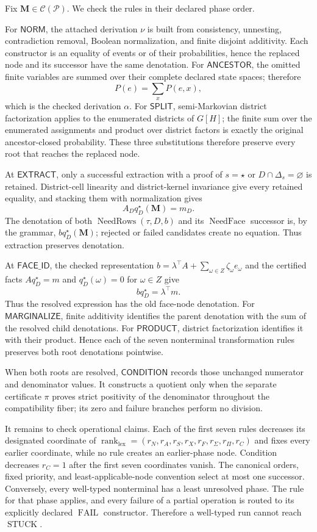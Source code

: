 Fix \(\mathbf M\in\mathcal C(\mathcal P)\).  We check the rules in their declared phase order.

For \(\mathsf{NORM}\), the attached derivation \(\nu\) is built from consistency, unnesting, contradiction removal, Boolean normalization, and finite disjoint additivity.  Each constructor is an equality of events or of their probabilities, hence the replaced node and its successor have the same denotation.  For \(\mathsf{ANCESTOR}\), the omitted finite variables are summed over their complete declared state spaces; therefore
\[
 P(e)=\sum_xP(e,x),
\]
which is the checked derivation \(\alpha\).  For \(\mathsf{SPLIT}\), semi-Markovian district factorization applies to the enumerated districts of \(G[H]\); the finite sum over the enumerated assignments and product over district factors is exactly the original ancestor-closed probability.  These three substitutions therefore preserve every root that reaches the replaced node.

At \(\mathsf{EXTRACT}\), only a successful extraction with a proof of \(s=\star\) or \(D\cap\Delta_s=\varnothing\) is retained.  District-cell linearity and district-kernel invariance give every retained equality, and stacking them with normalization gives
\[
 A_Dq_D^\star(\mathbf M)=m_D.
\]
The denotation of both \(\operatorname{NeedRows}(\tau,D,b)\) and its \(\operatorname{NeedFace}\) successor is, by the grammar, \(bq_D^\star(\mathbf M)\); rejected or failed candidates create no equation.  Thus extraction preserves denotation.

At \(\mathsf{FACE\_ID}\), the checked representation
\(
 b=\lambda^\top A+\sum_{\omega\in Z}\zeta_\omega e_\omega
\)
and the certified facts \(Aq_D^\star=m\) and \(q_D^\star(\omega)=0\) for \(\omega\in Z\) give
\[
 bq_D^\star=\lambda^\top m.
\]
Thus the resolved expression has the old face-node denotation.  For \(\mathsf{MARGINALIZE}\), finite additivity identifies the parent denotation with the sum of the resolved child denotations.  For \(\mathsf{PRODUCT}\), district factorization identifies it with their product.  Hence each of the seven nonterminal transformation rules preserves both root denotations pointwise.

When both roots are resolved, \(\mathsf{CONDITION}\) records those unchanged numerator and denominator values.  It constructs a quotient only when the separate certificate \(\pi\) proves strict positivity of the denominator throughout the compatibility fiber; its zero and failure branches perform no division.

It remains to check operational claims.  Each of the first seven rules decreases its designated coordinate of
\(
 \operatorname{rank}_{\mathrm{lex}}=(r_N,r_A,r_S,r_X,r_F,r_{\Sigma},r_{\Pi},r_C)
\)
and fixes every earlier coordinate, while no rule creates an earlier-phase node.  Condition decreases \(r_C=1\) after the first seven coordinates vanish.  The canonical orders, fixed priority, and least-applicable-node convention select at most one successor.  Conversely, every well-typed nonterminal has a least unresolved phase.  The rule for that phase applies, and every failure of a partial operation is routed to its explicitly declared \(\operatorname{FAIL}\) constructor.  Therefore a well-typed run cannot reach \(\operatorname{STUCK}\).